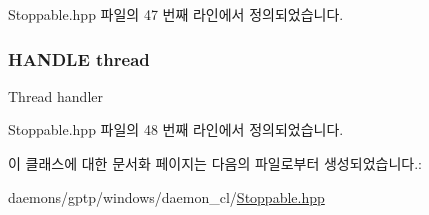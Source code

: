 Stoppable.\+hpp 파일의 47 번째 라인에서 정의되었습니다.

\subsubsection[{\texorpdfstring{thread}{thread}}]{\setlength{\rightskip}{0pt plus 5cm}H\+A\+N\+D\+LE thread\hspace{0.3cm}{\ttfamily [protected]}}\hypertarget{class_stoppable_adf8b62c27edd1f6b7641bb7bb7f60275}{}\label{class_stoppable_adf8b62c27edd1f6b7641bb7bb7f60275}
Thread handler 

Stoppable.\+hpp 파일의 48 번째 라인에서 정의되었습니다.



이 클래스에 대한 문서화 페이지는 다음의 파일로부터 생성되었습니다.\+:\begin{DoxyCompactItemize}
\item 
daemons/gptp/windows/daemon\+\_\+cl/\hyperlink{_stoppable_8hpp}{Stoppable.\+hpp}\end{DoxyCompactItemize}

